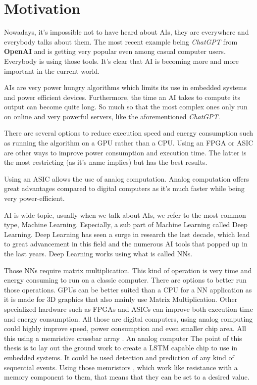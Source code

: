 \section{Motivation}
\label{sec:int_motivation}

Nowadays, it's impossible not to have heard about \acp{AI}, they are everywhere and everybody talks about them. The most recent example being \textit{ChatGPT} from \textbf{OpenAI} and is getting very popular even among casual computer users. Everybody is using those tools. It's clear that \ac{AI} is becoming more and more important in the current world.

\acp{AI} are very power hungry algorithms which limits its use in embedded systems and power efficient devices.
Furthermore, the time an \ac{AI} takes to compute its output can become quite long. So much so that the most complex ones only run on online and very powerful servers, like the aforementioned \textit{ChatGPT}.

There are several options to reduce execution speed and energy consumption such as running the algorithm on a \ac{GPU} rather than a \ac{CPU}. Using an \ac{FPGA} or \ac{ASIC} are other ways to improve power consumption and execution time.
The latter is the most restricting (as it's name implies) but has the best results.

Using an \ac{ASIC} allows the use of analog computation. Analog computation offers great advantages compared to digital computers as it's much faster while being very power-efficient.


\ac{AI} is wide topic, usually when we talk about \acp{AI}, we refer to the most common type, Machine Learning. Especially, a sub part of Machine Learning called Deep Learning. Deep Learning has seen a surge in research the last decade, which lead to great advancement in this field and the numerous \ac{AI} tools that popped up in the last years.
Deep Learning works using what is called \acp{NN}.

Those \acp{NN} require matrix multiplication. This kind of operation is very time and energy consuming to run on a classic computer. There are options to better run those operations. GPUs can be better suited than a CPU for a \ac{NN} application as it is made for 3D graphics that also mainly use Matrix Multiplication. Other specialized hardware such as FPGAs and ASICs can improve both execution time and energy consumption. All those are digital computers, using analog computing could highly improve speed, power consumption and even smaller chip area. All this using a memristive crossbar array \cite{Xbar}. An analog computer
The point of this thesis is to lay out the ground work to create a LSTM capable chip to use in embedded systems. It could be used detection and prediction of any kind of sequential events.
Using those memristors \cite{TheoMemristor}, which work like resistance with a memory component to them, that means that they can be set to a desired value.

